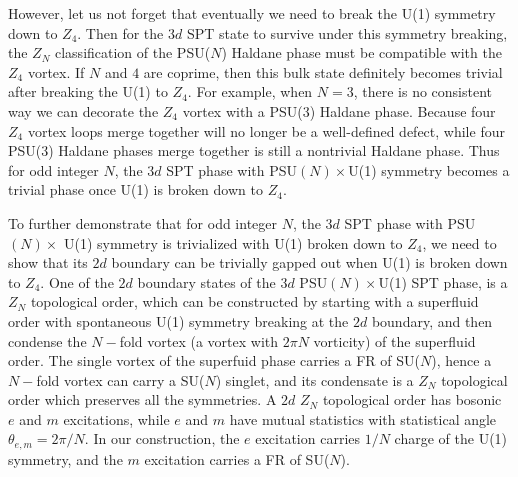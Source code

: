 \documentclass[aps,prb,twocolumn,superscriptaddress,showpacs]{revtex4}
\newcommand{\beqn}{\begin{eqnarray}}
\newcommand{\eeqn}{\end{eqnarray}}
\begin{document}

However, let us not forget that eventually we need to break the
U(1) symmetry down to $Z_4$. Then for the $3d$ SPT state to
survive under this symmetry breaking, the $Z_N$ classification of
the PSU($N$) Haldane phase must be compatible with the $Z_4$
vortex. If $N$ and $4$ are coprime, then this bulk state
definitely becomes trivial after breaking the U(1) to $Z_4$. For
example, when $N = 3$, there is no consistent way we can decorate
the $Z_4$ vortex with a PSU(3) Haldane phase. Because four $Z_4$
vortex loops merge together will no longer be a well-defined
defect, while four PSU(3) Haldane phases merge together is still a
nontrivial Haldane phase. Thus for odd integer $N$, the $3d$ SPT
phase with PSU$(N) \times$U(1) symmetry becomes a trivial phase
once U(1) is broken down to $Z_4$.

To further demonstrate that for odd integer $N$, the $3d$ SPT
phase with PSU$(N) \times$ U(1) symmetry is trivialized with U(1)
broken down to $Z_4$, we need to show that its $2d$ boundary can
be trivially gapped out when U(1) is broken down to $Z_4$. One of
the $2d$ boundary states of the $3d$ PSU$(N) \times$U(1) SPT
phase, is a $Z_N$ topological order, which can be constructed by
starting with a superfluid order with spontaneous U(1) symmetry
breaking at the $2d$ boundary, and then condense the $N-$fold
vortex (a vortex with $2\pi N$ vorticity) of the superfluid order.
The single vortex of the superfuid phase carries a FR of SU($N$),
hence a $N-$fold vortex can carry a SU($N$) singlet, and its
condensate is a $Z_N$ topological order which preserves all the
symmetries. A $2d$ $Z_N$ topological order has bosonic $e$ and $m$
excitations, while $e$ and $m$ have mutual statistics with
statistical angle $\theta_{e,m} = 2\pi/N$. In our construction,
the $e$ excitation carries $1/N$ charge of the U(1) symmetry, and
the $m$ excitation carries a FR of SU($N$).
\end{document}
